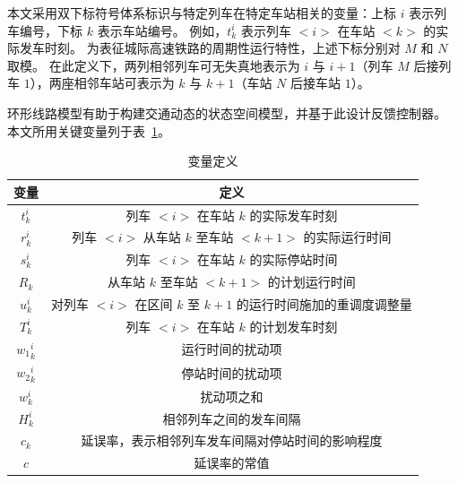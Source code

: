 本文采用双下标符号体系标识与特定列车在特定车站相关的变量：上标 $i$ 表示列车编号，下标 $k$ 表示车站编号。
例如，$t_{k}^{i}$ 表示列车 $<i>$ 在车站 $<k>$ 的实际发车时刻。
为表征城际高速铁路的周期性运行特性，上述下标分别对 $M$ 和 $N$ 取模。
在此定义下，两列相邻列车可无失真地表示为 $i$ 与 $i+1$（列车 $M$ 后接列车 $1$），两座相邻车站可表示为 $k$ 与 $k+1$（车站 $N$ 后接车站 $1$）。

环形线路模型有助于构建交通动态的状态空间模型，并基于此设计反馈控制器。
本文所用关键变量列于表~\ref{table1}。

\begin{table}
    \centering
    \caption{变量定义}
    \label{table1}
    \begin{tabular}{cc}
        \hline
        变量 & 定义 \\
        \hline
        
        $t_{k}^{i}$ & 列车 $<i>$ 在车站 $k$ 的实际发车时刻 \\
        
        $r_{k}^{i}$ & 列车 $<i>$ 从车站 $k$ 至车站 $<k+1>$ 的实际运行时间 \\
        
        $s_{k}^{i}$ & 列车 $<i>$ 在车站 $k$ 的实际停站时间 \\
        
        $R_{k}$ & 从车站 $k$ 至车站 $<k+1>$ 的计划运行时间 \\
        
        $u_{k}^{i}$ & 对列车 $<i>$ 在区间 $k$ 至 $k+1$ 的运行时间施加的重调度调整量 \\
        
        $T_{k}^{i}$ & 列车 $<i>$ 在车站 $k$ 的计划发车时刻 \\
        
        ${w_1}_{k}^{i}$ & 运行时间的扰动项 \\
        
        ${w_2}_{k}^{i}$ & 停站时间的扰动项 \\
        
        $w_{k}^{i}$ & 扰动项之和 \\
        
        $H_{k}^{i}$ & 相邻列车之间的发车间隔 \\
        
        $c_{k}$ & 延误率，表示相邻列车发车间隔对停站时间的影响程度 \\
        
        $c$ & 延误率的常值 \\
        

\end{tabular}
\end{table}
